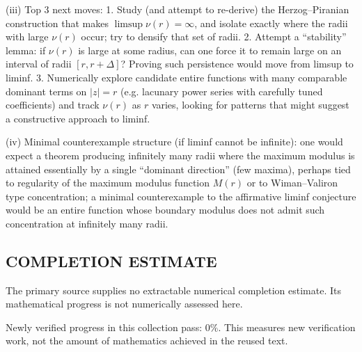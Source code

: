 (iii) Top 3 next moves:
1. Study (and attempt to re-derive) the Herzog--Piranian construction that makes \(\limsup\nu(r)=\infty\), and isolate exactly where the radii with large \(\nu(r)\) occur; try to densify that set of radii.
2. Attempt a ``stability'' lemma: if \(\nu(r)\) is large at some radius, can one force it to remain large on an interval of radii \([r,r+\Delta]\)? Proving such persistence would move from limsup to liminf.
3. Numerically explore candidate entire functions with many comparable dominant terms on \(|z|=r\) (e.g. lacunary power series with carefully tuned coefficients) and track \(\nu(r)\) as \(r\) varies, looking for patterns that might suggest a constructive approach to liminf.

(iv) Minimal counterexample structure (if liminf cannot be infinite): one would expect a theorem producing infinitely many radii where the maximum modulus is attained essentially by a single ``dominant direction'' (few maxima), perhaps tied to regularity of the maximum modulus function \(M(r)\) or to Wiman--Valiron type concentration; a minimal counterexample to the affirmative liminf conjecture would be an entire function whose boundary modulus does not admit such concentration at infinitely many radii.




\subsection*{COMPLETION ESTIMATE}
The primary source supplies no extractable numerical completion estimate. Its mathematical progress is not numerically assessed here.

Newly verified progress in this collection pass: $0\%$. This measures new verification work, not the amount of mathematics achieved in the reused text.
